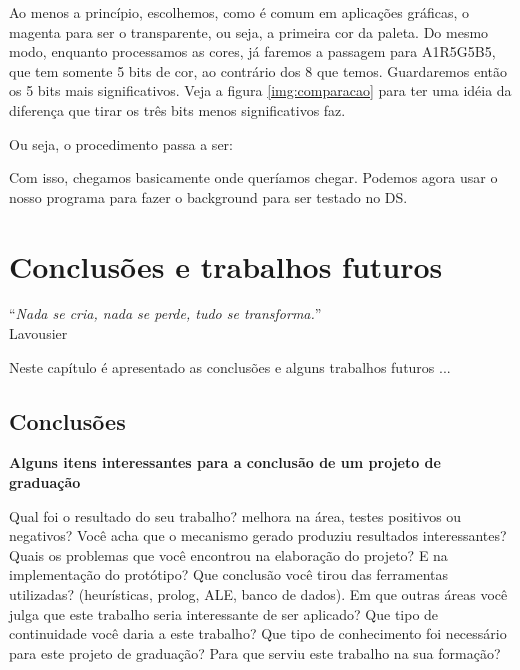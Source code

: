 \documentclass[brazil]{abnt}
\begin{document}
Ao menos a princípio, escolhemos, como é comum em aplicações gráficas, o magenta para ser o transparente, ou seja, a primeira cor da paleta. Do mesmo modo, enquanto processamos as cores, já faremos a passagem para A1R5G5B5, que tem somente 5 bits de cor, ao contrário dos 8 que temos. Guardaremos então os 5 bits mais significativos. Veja a figura \ref{img:comparacao} para ter uma idéia da diferença que tirar os três bits menos significativos faz.

Ou seja, o procedimento passa a ser:



Com isso, chegamos basicamente onde queríamos chegar. Podemos agora usar o nosso programa para fazer o background para ser testado no DS. 

\chapter{Conclusões e trabalhos futuros\label{cap:conclusao}}

\vfill{}
\begin{flushright}{}``\emph{Nada se cria, nada se perde, tudo se
transforma.}''\\
{\small Lavousier}\end{flushright}{\small \par}
\vfill{}

Neste capítulo é apresentado as conclusões e alguns trabalhos futuros
...
\newpage


\section{Conclusões}

{\bf Alguns itens interessantes para a conclusão de um projeto de graduação}

Qual foi o resultado do seu trabalho? melhora na área, testes positivos ou negativos?
Você acha que o mecanismo gerado produziu resultados interessantes?
Quais os problemas que você encontrou na elaboração do projeto?
E na implementação do protótipo?
Que conclusão você tirou das ferramentas utilizadas? (heurísticas, prolog, ALE, banco de dados).
Em que outras áreas você julga que este trabalho seria interessante de ser aplicado?
Que tipo de continuidade você daria a este trabalho?
Que tipo de conhecimento foi necessário para este projeto de graduação?
Para que serviu este trabalho na sua formação?
\end{document}
